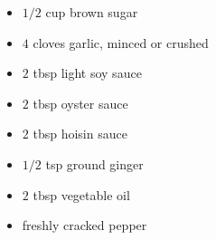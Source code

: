 \begin{minipage}{\textwidth}
\begin{multicols*}{2}
\columnbreak
\begin{minipage}{\linewidth}
\ingredients[Glaze]
\vspace{-1em}
\begin{itemize}
    \item $1/2$ cup brown sugar
    \item $4$ cloves garlic, minced or crushed
    \item $2$ tbsp light soy sauce
    \item $2$ tbsp oyster sauce
    \item $2$ tbsp hoisin sauce
    \item $1/2$ tsp ground ginger
    \item $2$ tbsp vegetable oil
    \item freshly cracked pepper
\end{itemize}
\end{minipage}
\end{multicols*}
\end{minipage}
\vspace{0.5em}

